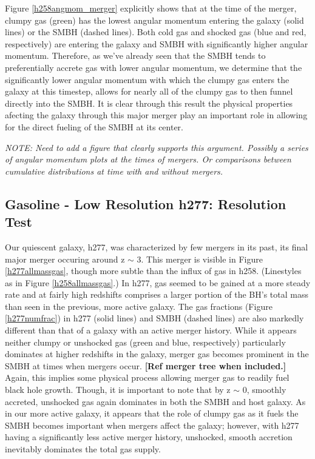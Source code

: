 \documentclass[manuscript]{aastex}
\begin{document}
Figure \ref{h258angmom_merger} explicitly shows that at the time of the merger, clumpy gas (green) has the lowest angular momentum entering the galaxy (solid lines) or the SMBH (dashed lines). Both cold gas and shocked gas (blue and red, respectively) are entering the galaxy and SMBH with significantly higher angular momentum. Therefore, as we've already seen that the SMBH tends to preferentially accrete gas with lower angular momentum, we determine that the significantly lower angular momentum with which the clumpy gas enters the galaxy at this timestep, allows for nearly all of the clumpy gas to then funnel directly into the SMBH. It is clear through this result the physical properties afecting the galaxy through this major merger play an important role in allowing for the direct fueling of the SMBH at its center.

\textit{NOTE: Need to add a figure that clearly supports this argument. Possibly a series of angular momentum plots at the times of mergers. Or comparisons between cumulative distributions at time with and without mergers.}

\subsection{Gasoline - Low Resolution h277: Resolution Test}
	
Our quiescent galaxy, h277, was characterized by few mergers in its past, its final major merger occuring around z $\sim$ 3. This merger is visible in Figure \ref{h277allmassgas}, though more subtle than the influx of gas in h258. (Linestyles as in Figure \ref{h258allmassgas}.) In h277, gas seemed to be gained at a more steady rate and at fairly high redshifts comprises a larger portion of the BH's total mass than seen in the previous, more active galaxy. The gas fractions (Figure \ref{h277numfrac}) in h277 (solid lines) and SMBH (dashed lines) are also markedly different than that of a galaxy with an active merger history. While it appears neither clumpy or unshocked gas (green and blue, respectively) particularly dominates at higher redshifts in the galaxy, merger gas becomes prominent in the SMBH at times when mergers occur. \textbf{[Ref merger tree when included.]} Again, this implies some physical process allowing merger gas to readily fuel black hole growth. Though, it is important to note that by z $\sim$ 0, smoothly accreted, unshocked gas again dominates in both the SMBH and host galaxy. As in our more active galaxy, it appears that the role of clumpy gas as it fuels the SMBH becomes important when mergers affect the galaxy; however, with h277 having a significantly less active merger history, unshocked, smooth accretion inevitably dominates the total gas supply.
\end{document}
